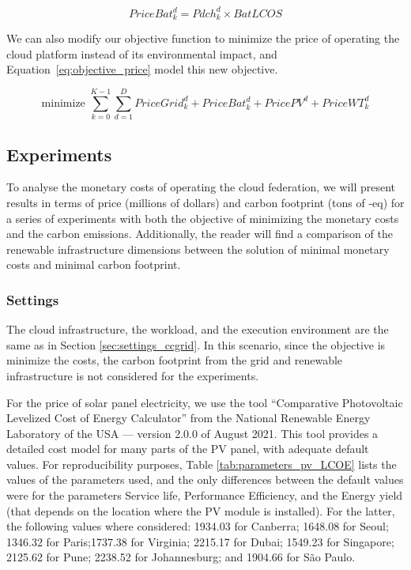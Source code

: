 \begin{equation} \label{eq:pricebat}
   PriceBat^d_k = Pdch^d_k \times BatLCOS
\end{equation}


We can also modify our objective function to minimize the price of operating the cloud platform instead of its environmental impact, and Equation~\eqref{eq:objective_price} model this new objective.

\begin{equation} \label{eq:objective_price}
\text{minimize }\sum_{k=0}^{K-1} \sum_{d=1}^D PriceGrid^d_k  + PriceBat^d_k + PricePV^d+ PriceWT^d_k
\end{equation}


\subsection{Experiments}

To analyse the monetary costs of operating the cloud federation, we will present results in terms of price (millions of dollars) and carbon footprint (tons of -eq) for a series of experiments with both the objective of minimizing the monetary costs and the carbon emissions. Additionally, the reader will find a comparison of the renewable infrastructure dimensions between the solution of minimal monetary costs and minimal carbon footprint.


\subsubsection{Settings}

The cloud infrastructure, the workload, and the execution environment are the same as in Section  \ref{sec:settings_ccgrid}. In this scenario, since the objective is minimize the costs, the carbon footprint from the grid and renewable infrastructure is not considered for the experiments.

For the price of solar panel electricity, we use the tool ``Comparative Photovoltaic Levelized Cost of Energy Calculator'' from the National Renewable Energy Laboratory of the USA \cite{pv_lcoe_calc} --- version 2.0.0 of August 2021. This tool provides a detailed cost model for many parts of the PV panel, with adequate default values. For reproducibility purposes, Table \ref{tab:parameters_pv_LCOE} lists the values of the parameters used, and the only differences between the default values were for the parameters Service life, Performance Efficiency, and the Energy yield (that depends on the location where the PV module is installed). For the latter, the following values where considered:   1934.03 for Canberra;  1648.08 for Seoul; 1346.32 for Paris;1737.38 for Virginia; 2215.17 for Dubai; 1549.23 for Singapore; 2125.62 for Pune;  2238.52 for Johannesburg; and 1904.66 for São Paulo.

